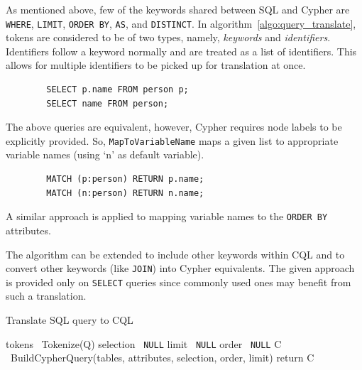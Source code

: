 \documentclass[12pt]{article}
\begin{document}
    As mentioned above, few of the keywords shared between SQL and Cypher are \verb|WHERE|, \verb|LIMIT|, \verb|ORDER BY|, \verb|AS|, and \verb|DISTINCT|. In algorithm~\ref{algo:query_translate}, tokens are considered to be of two types, namely, \textit{keywords} and \textit{identifiers}. Identifiers follow a keyword normally and are treated as a list of identifiers. This allows for multiple identifiers to be picked up for translation at once.

    \begin{lstlisting}
        SELECT p.name FROM person p;
        SELECT name FROM person;
    \end{lstlisting}
    The above queries are equivalent, however, Cypher requires node labels to be explicitly provided. So, \verb|MapToVariableName| maps a given list to appropriate variable names (using `n' as default variable).
    \begin{lstlisting}
        MATCH (p:person) RETURN p.name;
        MATCH (n:person) RETURN n.name;
    \end{lstlisting}
    A similar approach is applied to mapping variable names to the \verb|ORDER BY| attributes.

    The algorithm can be extended to include other keywords within CQL and to convert other keywords (like \verb|JOIN|) into Cypher equivalents. The given approach is provided only on \verb|SELECT| queries since commonly used ones may benefit from such a translation.

    \begin{algorithm}[htb!]
        \SetAlgoLined
        \caption{Translate SQL query to CQL}
        tokens \gets\ Tokenize(Q)
        selection \gets\ \verb|NULL|\;
        limit \gets\ \verb|NULL|\;
        order \gets\ \verb|NULL|\;
        C \gets\ BuildCypherQuery(tables, attributes, selection, order, limit)\;
        return C\;
        \label{algo:query_translate}
    \end{algorithm}
\end{document}
